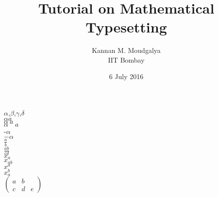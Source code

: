 \documentclass[12pt,a5paper]{article}
\title{Tutorial on Mathematical Typesetting}
\author{Kannan M. Moudgalya \\ IIT Bombay}
\date{6 July 2016}
\begin{document}
\maketitle

$\alpha$,$\beta$,$\gamma$,$\delta$ \\

$\alpha a$ \\
$\alpha \ a$ \\
$\alpha \quad a$  \\

-$\alpha$ \\
$-\alpha$  \\

$\frac a b$ \\
$\frac{ab}{cd}$ \\

$x_a$ \\
$x_{ab}$ \\
$x^a$ \\
$x_a^b$ \\  

$\begin{pmatrix}
a & b \\
c & d & e
\end{pmatrix}$ \\
\end{document}
